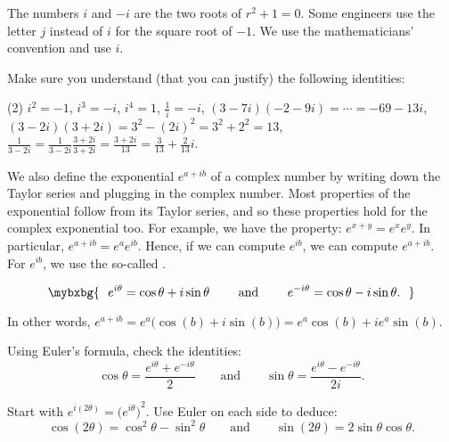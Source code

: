 The numbers
$i$ and $-i$ are the two roots of $r^2 + 1 = 0$.
Some engineers use the letter $j$ instead of $i$ for the square
root of $-1$.  We use the mathematicians' convention and use $i$.

\begin{exercise}
Make sure you understand (that you can justify)
the following identities:
\begin{tasks}(2)
\task $i^2 = -1$, $i^3 = -i$, $i^4 = 1$,
\task $\frac{1}{i} = -i$,
\task $(3-7i)(-2-9i) = \cdots = -69-13i$,
\task $(3-2i)(3+2i) = 3^2 - {(2i)}^2 = 3^2 + 2^2 = 13$,
\task $\frac{1}{3-2i} = \frac{1}{3-2i} \frac{3+2i}{3+2i} = \frac{3+2i}{13}
= \frac{3}{13}+\frac{2}{13}i$.
\end{tasks}
\end{exercise}

\pagebreak[2]
We also define the exponential $e^{a+ib}$ of a complex number
by writing down the Taylor series and plugging in the complex
number.  Most properties of the exponential follow
from its
Taylor series, and so these
properties hold for the complex
exponential too.
For example, we have the property:
$e^{x+y} = e^x e^y$.  In particular,
$e^{a+ib} = e^a e^{ib}$.  Hence, if we can compute $e^{ib}$, we can
compute $e^{a+ib}$.  For $e^{ib}$, we use the so-called
\emph{}.

\begin{theorem} \label{eulersformula}
\begin{equation*}
\mybxbg{~~
e^{i \theta} = \cos \theta + i \sin \theta
\qquad \text{ and } \qquad
e^{- i \theta} = \cos \theta - i \sin \theta .
~~}
\end{equation*}
\end{theorem}

In other words, $e^{a+ib} = e^a \bigl( \cos(b) + i \sin(b) \bigr) = e^a \cos(b) + i e^a \sin(b)$.

\begin{exercise}
Using Euler's formula, check the identities:
\begin{equation*}
\cos \theta = \frac{e^{i \theta} + e^{-i \theta}}{2}
\qquad \text{and} \qquad
\sin \theta = \frac{e^{i \theta} - e^{-i \theta}}{2i}.
\end{equation*}
\end{exercise}

\begin{exercise}
Start with $e^{i(2\theta)} = {\bigl(e^{i \theta} \bigr)}^2$.  Use Euler on
each side to deduce:
\begin{equation*}
\cos (2\theta) = \cos^2 \theta - \sin^2 \theta
\qquad \text{and} \qquad
\sin (2\theta) = 2 \sin \theta \cos \theta .
\end{equation*}
\end{exercise}

